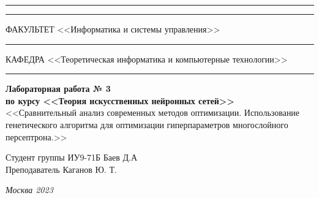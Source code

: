\documentclass[a4paper, 14pt]{extarticle}
\begin{document}
\begin{titlepage}
\vspace{-25pt}
\hspace{-35pt}\rule{\textwidth}{2.3pt}

\vspace*{-20.3pt}
\hspace{-35pt}\rule{\textwidth}{0.4pt}

\vspace{1.5ex}
\hspace{-35pt} \noindent \small ФАКУЛЬТЕТ\hspace{80pt} <<Информатика и системы управления>>

\vspace*{-16pt}
\hspace{47pt}\rule{0.83\textwidth}{0.4pt}

\vspace{0.5ex}
\hspace{-35pt} \noindent \small КАФЕДРА\hspace{50pt} <<Теоретическая информатика и компьютерные технологии>>

\vspace*{-16pt}
\hspace{30pt}\rule{0.866\textwidth}{0.4pt}

\vspace{11em}

\begin{center}
\Large {\bf Лабораторная работа № 3} \\
\large {\bf по курсу <<Теория искусственных нейронных сетей>>} \\
\large <<Сравнительный анализ современных методов оптимизации. Использование генетического алгоритма для оптимизации гиперпараметров многослойного персептрона.>>
\end{center}\normalsize

\vspace{8em}


\begin{flushright}
  {Студент группы ИУ9-71Б Баев Д.А \hspace*{15pt}\\
  \vspace{2ex}
  Преподаватель Каганов Ю. Т.\hspace*{15pt}}
\end{flushright}

\bigskip

\vfill


\begin{center}
\textsl{Москва 2023}
\end{center}
\end{titlepage}
\end{document}
